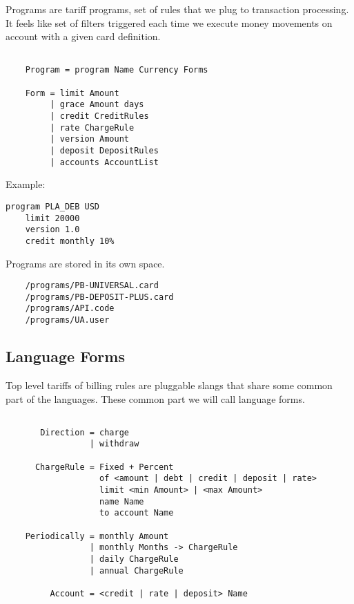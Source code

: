 Programs are tariff programs, set of rules that we plug to transaction processing.
It feels like set of filters triggered each time we execute money
movements on account with a given card definition.

\vspace{1\baselineskip}
\begin{lstlisting}[caption=BNF]

    Program = program Name Currency Forms

    Form = limit Amount
         | grace Amount days
         | credit CreditRules
         | rate ChargeRule
         | version Amount
         | deposit DepositRules
         | accounts AccountList
\end{lstlisting}
\vspace{1\baselineskip}

Example:

\vspace{1\baselineskip}
\begin{lstlisting}[caption=credit.card]
    program PLA_DEB USD
    limit 20000
    version 1.0
    credit monthly 10%
\end{lstlisting}
\vspace{1\baselineskip}


Programs are stored in its own space.

\vspace{1\baselineskip}
\begin{lstlisting}
    /programs/PB-UNIVERSAL.card
    /programs/PB-DEPOSIT-PLUS.card
    /programs/API.code
    /programs/UA.user
\end{lstlisting}
\vspace{1\baselineskip}

\newpage
\subsection{Language Forms}

Top level tariffs of billing rules are pluggable slangs that
share some common part of the languages. These common part we will
call language forms.

\vspace{1\baselineskip}
\begin{lstlisting}[caption=BNF]

       Direction = charge
                 | withdraw

      ChargeRule = Fixed + Percent
                   of <amount | debt | credit | deposit | rate>
                   limit <min Amount> | <max Amount>
                   name Name
                   to account Name

    Periodically = monthly Amount
                 | monthly Months -> ChargeRule
                 | daily ChargeRule
                 | annual ChargeRule

         Account = <credit | rate | deposit> Name

\end{lstlisting}
\vspace{1\baselineskip}

